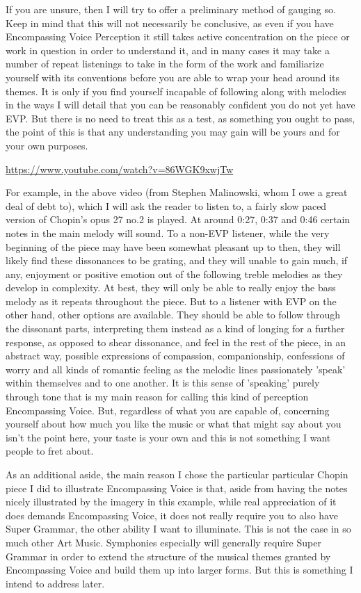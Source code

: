 \documentclass[]{article}
\begin{document}
If you are unsure, then I will try to offer a preliminary method of gauging so. Keep in mind that this will not necessarily be conclusive, as even if you have Encompassing Voice Perception it still takes active concentration on the piece or work in question in order to understand it, and in many cases it may take a number of repeat listenings to take in the form of the work and familiarize yourself with its conventions before you are able to wrap your head around its themes. It is only if you find yourself incapable of following along with melodies in the ways I will detail that you can be reasonably confident you do not yet have EVP. But there is no need to treat this as a test, as something you ought to pass, the point of this is that any understanding you may gain will be yours and for your own purposes.

\url{https://www.youtube.com/watch?v=86WGK9xwjTw}

For example, in the above video (from Stephen Malinowski, whom I owe a great deal of debt to), which I will ask the reader to listen to, a fairly slow paced version of Chopin's opus 27 no.2 is played. At around 0:27, 0:37 and 0:46 certain notes in the main melody will sound. To a non-EVP listener, while the very beginning of the piece may have been somewhat pleasant up to then, they will likely find these dissonances to be grating, and they will unable to gain much, if any, enjoyment or positive emotion out of the following treble melodies as they develop in complexity. At best, they will only be able to really enjoy the bass melody as it repeats throughout the piece. But to a listener with EVP on the other hand, other options are available. They should be able to follow through the dissonant parts, interpreting them instead as a kind of longing for a further response, as opposed to shear dissonance, and feel in the rest of the piece, in an abstract way, possible expressions of compassion, companionship, confessions of worry and all kinds of romantic feeling as the melodic lines passionately 'speak' within themselves and to one another. It is this sense of 'speaking' purely through tone that is my main reason for calling this kind of perception Encompassing Voice. But, regardless of what you are capable of, concerning yourself about how much you like the music or what that might say about you isn't the point here, your taste is your own and this is not something I want people to fret about.

As an additional aside, the main reason I chose the particular particular Chopin piece I did to illustrate Encompassing Voice is that, aside from having the notes nicely illustrated by the imagery in this example, while real appreciation of it does demands Encompassing Voice, it does not really require you to also have Super Grammar, the other ability I want to illuminate. This is not the case in so much other Art Music. Symphonies especially will generally require Super Grammar in order to extend the structure of the musical themes granted by Encompassing Voice and build them up into larger forms. But this is something I intend to address later.
\end{document}
